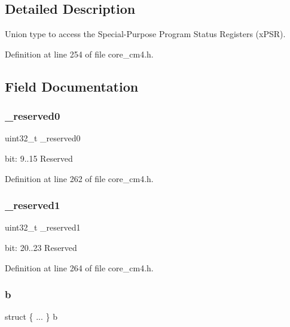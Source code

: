 \subsection{Detailed Description}
Union type to access the Special-\/\+Purpose Program Status Registers (x\+P\+SR). 

Definition at line 254 of file core\+\_\+cm4.\+h.



\subsection{Field Documentation}
\mbox{\label{unionx_p_s_r___type_ac8a6a13838a897c8d0b8bc991bbaf7c1}} 
\subsubsection{\texorpdfstring{\+\_\+reserved0}{\_reserved0}}
{\footnotesize\ttfamily uint32\+\_\+t \+\_\+reserved0}

bit\+: 9..15 Reserved 

Definition at line 262 of file core\+\_\+cm4.\+h.

\mbox{\label{unionx_p_s_r___type_a959a73d8faee56599b7e792a7c5a2d16}} 
\subsubsection{\texorpdfstring{\+\_\+reserved1}{\_reserved1}}
{\footnotesize\ttfamily uint32\+\_\+t \+\_\+reserved1}

bit\+: 20..23 Reserved 

Definition at line 264 of file core\+\_\+cm4.\+h.

\mbox{\label{unionx_p_s_r___type_a8d8c45d946ef8df11f4cac72c667e98b}} 
\subsubsection{\texorpdfstring{b}{b}}
{\footnotesize\ttfamily struct \{ ... \}   b}

